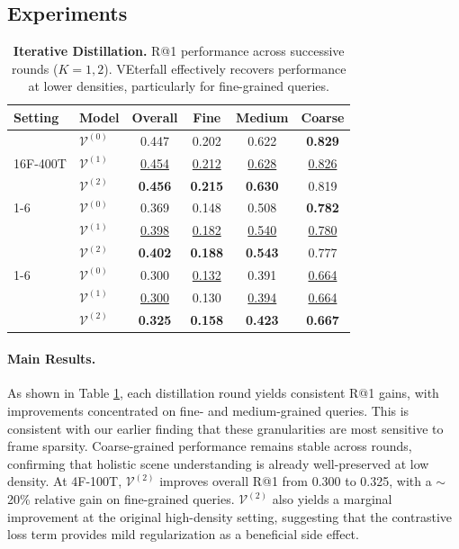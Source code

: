 \subsection{Experiments}

\begin{table}[t]
    \centering
    \caption{\textbf{Iterative Distillation.} R@1 performance across successive rounds ($K=1, 2$). VEterfall effectively recovers performance at lower densities, particularly for fine-grained queries.}
    \label{mglvr:tab:distillation}
    \begin{tabular}{@{}ll|*{4}{c}@{}}
        \toprule
        Setting & Model & Overall & Fine & Medium & Coarse \\
        \midrule
        \multirow{3}{*}{16F-400T} 
          & $\mathcal{V}^{(0)}$ & 0.447 & 0.202 & 0.622 & \textbf{0.829} \\
          & $\mathcal{V}^{(1)}$ & \underline{0.454} & \underline{0.212} & \underline{0.628} & \underline{0.826} \\
          & $\mathcal{V}^{(2)}$ & \textbf{0.456} & \textbf{0.215} & \textbf{0.630} & 0.819 \\
        \cmidrule(lr){1-6}
        \multirow{3}{*}{8F-200T} 
          & $\mathcal{V}^{(0)}$ & 0.369 & 0.148 & 0.508 & \textbf{0.782} \\
          & $\mathcal{V}^{(1)}$ & \underline{0.398} & \underline{0.182} & \underline{0.540} & \underline{0.780} \\
          & $\mathcal{V}^{(2)}$ & \textbf{0.402} & \textbf{0.188} & \textbf{0.543} & 0.777 \\
        \cmidrule(lr){1-6}
        \multirow{3}{*}{4F-100T} 
          & $\mathcal{V}^{(0)}$ & 0.300 & \underline{0.132} & 0.391 & \underline{0.664} \\
          & $\mathcal{V}^{(1)}$ & \underline{0.300} & 0.130 & \underline{0.394} & \underline{0.664} \\
          & $\mathcal{V}^{(2)}$ & \textbf{0.325} & \textbf{0.158} & \textbf{0.423} & \textbf{0.667} \\
        \bottomrule
    \end{tabular}
\end{table}

\paragraph{Main Results.}
As shown in Table \ref{mglvr:tab:distillation}, each distillation round yields consistent R@1 gains, with improvements concentrated on fine- and medium-grained queries. This is consistent with our earlier finding that these granularities are most sensitive to frame sparsity. Coarse-grained performance remains stable across rounds, confirming that holistic scene understanding is already well-preserved at low density. At 4F-100T, $\mathcal{V}^{(2)}$ improves overall R@1 from 0.300 to 0.325, with a ${\sim}$20\% relative gain on fine-grained queries. $\mathcal{V}^{(2)}$ also yields a marginal improvement at the original high-density setting, suggesting that the contrastive loss term provides mild regularization as a beneficial side effect.

